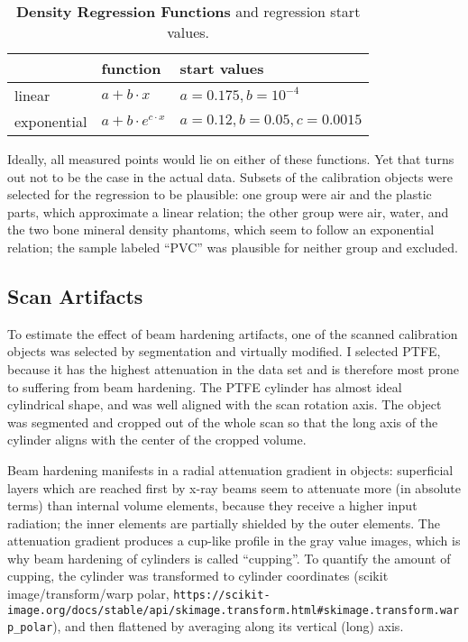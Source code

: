 \begin{table}[b]
\caption{\label{tab:regressions}\textbf{Density Regression Functions} and regression start values.}
\centering
\begin{tabular}{|l|l|l|}
\hline
 & function & start values\\[0pt]
\hline
\hline
linear & \(a + b \cdot x\) & \(a=0.175, b=10^{-4}\)\\[0pt]
exponential & \(a+b\cdot e^{c\cdot x}\) & \(a=0.12, b=0.05, c=0.0015\)\\[0pt]
\hline
\hline
\end{tabular}
\end{table}

Ideally, all measured points would lie on either of these functions.
Yet that turns out not to be the case in the actual data.
Subsets of the calibration objects were selected for the regression to be plausible: one group were air and the plastic parts, which approximate a linear relation; the other group were air, water, and the two bone mineral density phantoms, which seem to follow an exponential relation; the sample labeled ``PVC'' was plausible for neither group and excluded.


\FloatBarrier
\subsection{Scan Artifacts}
\label{sec:org813c1a7}
To estimate the effect of beam hardening artifacts, one of the scanned calibration objects was selected by segmentation and virtually modified.
I selected PTFE, because it has the highest attenuation in the data set and is therefore most prone to suffering from beam hardening.
The PTFE cylinder has almost ideal cylindrical shape, and was well aligned with the scan rotation axis.
The object was segmented and cropped out of the whole scan so that the long axis of the cylinder aligns with the center of the cropped volume.


Beam hardening manifests in a radial attenuation gradient in objects: superficial layers which are reached first by x-ray beams seem to attenuate more (in absolute terms) than internal volume elements, because they receive a higher input radiation; the inner elements are partially shielded by the outer elements.
The attenuation gradient produces a cup-like profile in the gray value images, which is why beam hardening of cylinders is called ``cupping''.
To quantify the amount of cupping, the cylinder was transformed to cylinder coordinates (scikit image/transform/warp polar, \nolinkurl{https://scikit-image.org/docs/stable/api/skimage.transform.html#skimage.transform.warp_polar}), and then flattened by averaging along its vertical (long) axis.

